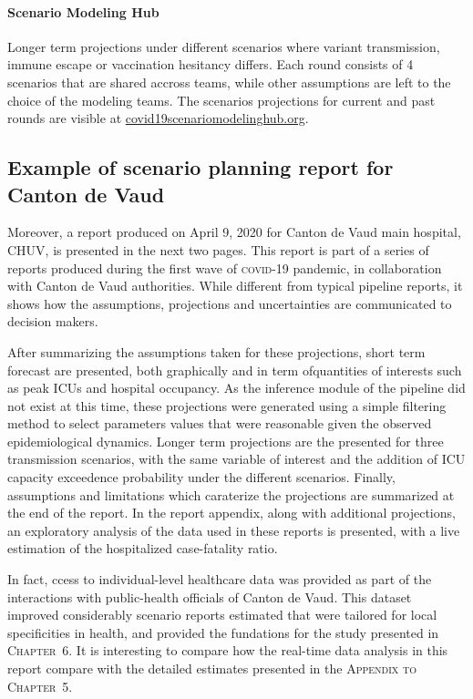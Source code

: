 {\paragraph{Scenario Modeling Hub} Longer term projections under different scenarios where \eg variant transmission, immune escape or vaccination hesitancy  differs. Each round consists of 4 scenarios that are shared accross teams, while other assumptions are left to the choice of the modeling teams. The scenarios projections for current and past rounds are visible at \url{covid19scenariomodelinghub.org}\cite[][presents round 4 results.]{Borchering:ModelingFutureCOVID19:2021}.

\subsection{Example of scenario planning report for Canton de Vaud}
Moreover, a report produced on April 9, 2020 for Canton de Vaud main hospital, CHUV, is presented in the next two pages. This report is part of a series of reports produced during the first wave of \textsc{covid}-19 pandemic, in collaboration with Canton de Vaud authorities. While different from typical pipeline reports, it shows how the assumptions, projections and uncertainties are communicated to decision makers. 

After summarizing the assumptions taken for these projections, short term forecast are presented, both graphically and in term ofquantities of interests such as peak ICUs and hospital occupancy. As the inference module of the pipeline did not exist at this time, these projections were generated using a simple filtering method to select parameters values that were reasonable given the observed epidemiological dynamics.  Longer term projections are the presented for three transmission scenarios, with the same variable of interest and the addition of ICU capacity exceedence probability under the different scenarios. Finally, assumptions and limitations which caraterize the projections are summarized at the end of the report. In the report appendix, along with additional projections, an exploratory analysis of the data used in these reports is presented, with a live estimation of the hospitalized case-fatality ratio. 

In fact, ccess to individual-level healthcare data was provided as part of the interactions with public-health officials of Canton de Vaud.  This dataset improved considerably scenario reports estimated that were tailored for local specificities in health, and provided the fundations for the study presented in \textsc{Chapter~6}. It is interesting to compare how the real-time data analysis in this report compare with the detailed estimates presented in the \textsc{Appendix to Chapter~5}.

}
